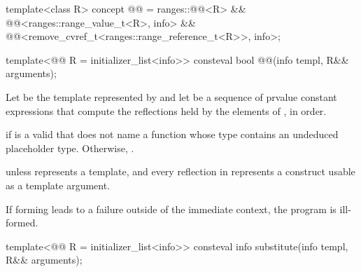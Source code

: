\begin{itemdecl}
template<class R>
concept @@ =
  ranges::@@<R> &&
  @@<ranges::range_value_t<R>, info> &&
  @@<remove_cvref_t<ranges::range_reference_t<R>>, info>;

template<@@ R = initializer_list<info>>
  consteval bool @@(info templ, R&& arguments);
\end{itemdecl}

\begin{itemdescr}
\pnum
Let  be the template represented by 
and let  be a sequence of prvalue constant expressions
that compute the reflections held by the elements of ,
in order.

\pnum
\returns
{} if  is a valid 
that does not name a function
whose type contains an undeduced placeholder type.
Otherwise, .

\pnum
\throws
{} unless
 represents a template,
and every reflection in  represents a construct
usable as a template argument.

\pnum
\begin{note}
If forming  leads to a failure
outside of the immediate context,
the program is ill-formed.
\end{note}
\end{itemdescr}

%
\begin{itemdecl}
template<@@ R = initializer_list<info>>
  consteval info substitute(info templ, R&& arguments);
\end{itemdecl}

